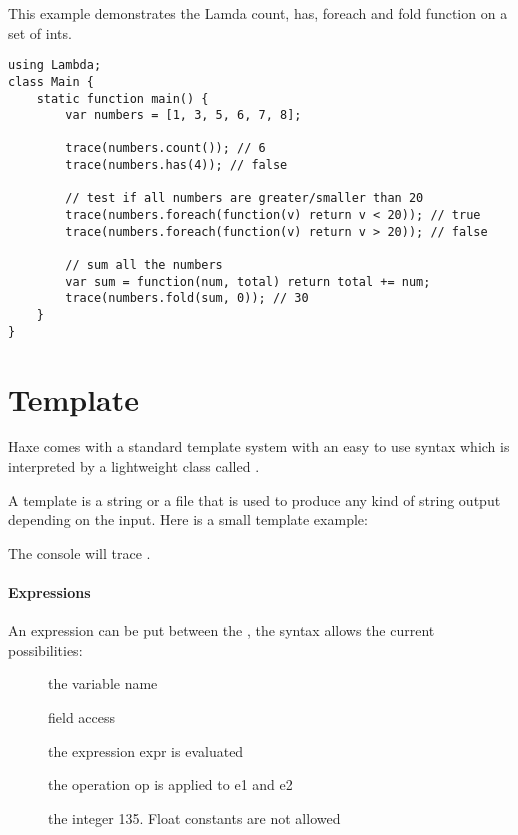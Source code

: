 This example demonstrates the Lamda count, has, foreach and fold function on a set of ints.

\begin{lstlisting}
using Lambda;
class Main {
    static function main() {
        var numbers = [1, 3, 5, 6, 7, 8];
		
		trace(numbers.count()); // 6
		trace(numbers.has(4)); // false
		
        // test if all numbers are greater/smaller than 20
		trace(numbers.foreach(function(v) return v < 20)); // true
        trace(numbers.foreach(function(v) return v > 20)); // false
		
        // sum all the numbers
		var sum = function(num, total) return total += num;
		trace(numbers.fold(sum, 0)); // 30
    }
}
\end{lstlisting} 

\section{Template}
\label{std-template}

Haxe comes with a standard template system with an easy to use syntax which is interpreted by a lightweight class called .

A template is a string or a file that is used to produce any kind of string output depending on the input. Here is a small template example:


The console will trace .

\paragraph{Expressions}
An expression can be put between the \ic{::}, the syntax allows the current possibilities:

\begin{description}
	\item[] the variable name
	\item[] field access
	\item[] the expression expr is evaluated
	\item[] the operation op is applied to e1 and e2
	\item[] the integer 135. Float constants are not allowed
\end{description}


